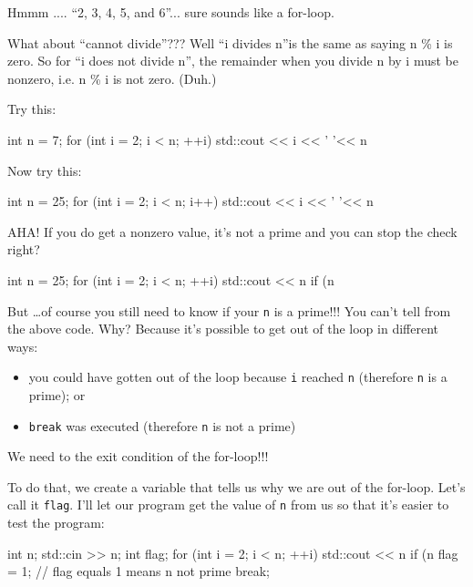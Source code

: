 \begin{console}
Hmmm .... ``2, 3, 4, 5, and 6''... sure sounds like a for-loop.

What about ``cannot divide''??? Well ``i divides n''is the same as
saying n \% i is zero. So for ``i does not divide n'', the remainder
when you divide n by i must be nonzero, i.e. n \% i is not zero. (Duh.)

Try this:
\begin{console}
int n = 7;
for (int i = 2; i < n; ++i)
{   
    std::cout << i << ' '<< n %
}
\end{console}
Now try this:
\begin{console}
int n = 25;
for (int i = 2; i < n; i++)
{   
    std::cout << i << ' '<< n %
}
\end{console}
AHA! If you do get a nonzero value, it's not a prime and
you can stop the check right?
\begin{console}
int n = 25;
for (int i = 2; i < n; ++i)
{   
    std::cout << n %
    if (n %
}
\end{console}
But \ldots of course you still need to know if your \texttt{n} is a
prime!!! You can't tell from the above code. Why?
Because it's possible to get out of the loop in
 different ways:

\begin{itemize}
\item
  you could have gotten out of the loop because \texttt{i} reached
  \texttt{n} (therefore \texttt{n} is a prime); or
\item
  \texttt{break} was executed (therefore \texttt{n} is not a prime)
\end{itemize}

We need to  the exit condition of the for-loop!!!

To do that, we create a variable that tells us why we are out of the
for-loop. Let's call it \texttt{flag}.
I'll let our program get the value of \texttt{n} from us
so that it's easier to test the program:
\begin{console}
int n;
std::cin >> n;
int flag;
for (int i = 2; i < n; ++i)
{   
    std::cout << n %
    if (n %
    {
        flag = 1; // flag equals 1 means n not prime
        break;
    }
}
\end{console}


\end{console}
